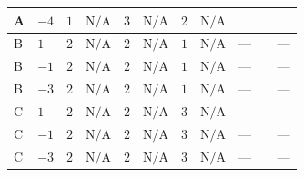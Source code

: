 \documentclass[8pt]{article}
\begin{document}
\begin{landscape}
\begin{longtable}{@{}llcccccc >{\raggedright\arraybackslash}p{0.21\linewidth} >{\raggedright\arraybackslash}p{0.21\linewidth} >{\raggedright\arraybackslash}p{0.21\linewidth}@{}}
\midrule
A & $-4$ & $1$ & $\text{N/A}$ & $3$ & $\text{N/A}$ & $2$ & $\text{N/A}$ & \scriptsize\adjustbox{max width=\linewidth}{$\begin{gathered} -6 {g_1}^2 {m_2^2}\end{gathered}$} & \scriptsize\adjustbox{max width=\linewidth}{$\begin{gathered} +2 {\lambda_{12}^{(1)}} {m_1^2}\end{gathered}$} & \scriptsize\adjustbox{max width=\linewidth}{$\begin{gathered} +{m_2^2} (8 {\lambda_{S_2}^{(1)}}+4 {\lambda_{S_2}^{(A)}})\end{gathered}$} \\
\midrule
B & $1$ & $2$ & $\text{N/A}$ & $2$ & $\text{N/A}$ & $1$ & $\text{N/A}$ & --- & \scriptsize\adjustbox{max width=\linewidth}{$\begin{gathered} +4 {\lambda_{12}^{(1)}} {m_1^2}\end{gathered}$} & --- \\
\midrule
B & $-1$ & $2$ & $\text{N/A}$ & $2$ & $\text{N/A}$ & $1$ & $\text{N/A}$ & --- & \scriptsize\adjustbox{max width=\linewidth}{$\begin{gathered} +4 {\lambda_{12}^{(1)}} {m_1^2}\end{gathered}$} & --- \\
\midrule
B & $-3$ & $2$ & $\text{N/A}$ & $2$ & $\text{N/A}$ & $1$ & $\text{N/A}$ & --- & \scriptsize\adjustbox{max width=\linewidth}{$\begin{gathered} +4 {\lambda_{12}^{(1)}} {m_1^2}\end{gathered}$} & --- \\
\midrule
C & $1$ & $2$ & $\text{N/A}$ & $2$ & $\text{N/A}$ & $3$ & $\text{N/A}$ & --- & \scriptsize\adjustbox{max width=\linewidth}{$\begin{gathered} +4 {\lambda_{12}^{(1)}} {m_1^2}\end{gathered}$} & --- \\
\midrule
C & $-1$ & $2$ & $\text{N/A}$ & $2$ & $\text{N/A}$ & $3$ & $\text{N/A}$ & --- & \scriptsize\adjustbox{max width=\linewidth}{$\begin{gathered} +4 {\lambda_{12}^{(1)}} {m_1^2}\end{gathered}$} & --- \\
\midrule
C & $-3$ & $2$ & $\text{N/A}$ & $2$ & $\text{N/A}$ & $3$ & $\text{N/A}$ & --- & \scriptsize\adjustbox{max width=\linewidth}{$\begin{gathered} +4 {\lambda_{12}^{(1)}} {m_1^2}\end{gathered}$} & --- \\

\end{longtable}
\end{landscape}
\end{document}
